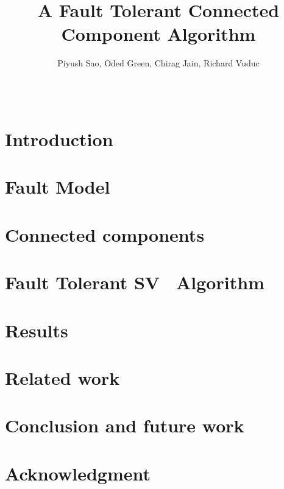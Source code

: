 \documentclass[english]{sig-alternate-05-2015}
\theoremstyle{plain}
\theoremstyle{definition}
\newcommand{\sv}{SV}
\begin{document}

\title{A Fault Tolerant Connected Component Algorithm }

  \author{
  \alignauthor
    Piyush Sao, Oded Green, Chirag Jain, Richard Vuduc \\
      \\
      \\
  }


\maketitle





\section{Introduction}

\label{sec:intro}


\section{Fault Model}

\label{sec:fault}

\section{Connected components}

\label{sec:connected}

\section{Fault Tolerant \sv~ Algorithm}

\label{sec:ft-connected}


\section{Results}

\label{sec:results}

\section{Related work}

\label{sec:related}

\section{Conclusion and future work}

\label{sec:conclusion}

\section{Acknowledgment}



% 

\end{document}
